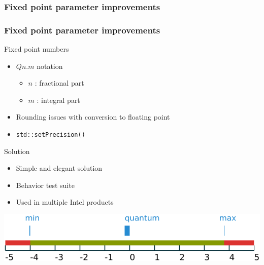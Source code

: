 \subsubsection{Fixed point parameter improvements}
\begin{frame}
    \frametitle{Fixed point parameter improvements}
    \begin{minipage}{0.5\textwidth}
        \begin{block}{Fixed point numbers}
            \begin{itemize}
                \item $Qn.m$ notation
                    \begin{itemize}
                        \item $n$ : fractional part
                        \item $m$ : integral part
                    \end{itemize}
                \item Rounding issues with conversion to floating point
                \item \lstinline{std::setPrecision()}
            \end{itemize}
        \end{block}
    \end{minipage}
    \begin{minipage}{0.4\textwidth}
        \flushright
        \begin{block}{Solution}
            \begin{itemize}
                \item Simple and elegant solution
                \item Behavior test suite
                \item Used in multiple Intel products
            \end{itemize}
        \end{block}
    \end{minipage}
    \begin{minipage}{\textwidth}
        \flushright
        \includegraphics[width=\textwidth]{../../report/src/img/fixedPoint.pdf}
    \end{minipage}
\end{frame}

